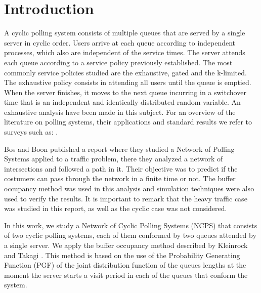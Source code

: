 \documentclass{article}
\begin{document}
%


\section{Introduction}

A cyclic polling system consists of multiple queues that are served by a single server in cyclic order. Users arrive at each queue according to independent processes, which also are independent of the service times. The server attends each queue according to a service policy previously established. The most commonly service policies studied are the exhaustive, gated and the k-limited. The exhaustive policy consists in attending all users until the queue is emptied. When the server finishes, it moves to the next queue incurring in a switchover time that is an independent and identically distributed random variable. An exhaustive analysis have been made in this subject. For an overview of the literature on polling systems, their applications and standard results we refer to surveys such as: \cite{Boxma, Kleinrock, LevySidi, Semenova, TakagiI, Takagi}. 

Bos and Boon \cite{BosBoon} published a report where they studied a Network of Polling Systems applied to a traffic problem, there they analyzed a network of intersections and followed a path in it. Their objective was to predict if the costumers can pass through the network in a finite time or not. The buffer occupancy method was used in this analysis and simulation techniques were also used to verify the results. It is important to remark that the heavy traffic case was studied in this report, as well as the cyclic case was not considered.

In this work, we study a Network of Cyclic Polling Systems (NCPS) that consists of two cyclic polling systems, each of them conformed by two queues attended by a single server. We apply the buffer occupancy method described by Kleinrock and Takagi \cite{TakagiI}. This method is based on the use of the Probability Generating Function (PGF) of the joint distribution function of the queues lengths at the moment the server starts a visit period in each of the queues that conform the system.
\end{document}
